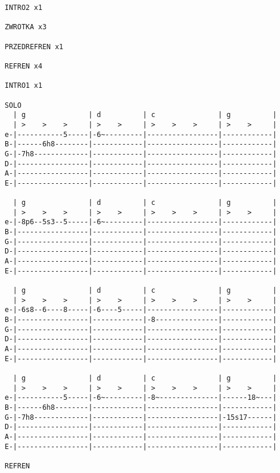 \begin{verbatim}
INTRO2 x1

ZWROTKA x3

PRZEDREFREN x1

REFREN x4

INTRO1 x1

SOLO
  | g               | d          | c               | g          |
  | >    >    >     | >    >     | >    >    >     | >    >     |
e-|-----------5-----|-6~---------|-----------------|------------|
B-|------6h8--------|------------|-----------------|------------|
G-|-7h8-------------|------------|-----------------|------------|
D-|-----------------|------------|-----------------|------------|
A-|-----------------|------------|-----------------|------------|
E-|-----------------|------------|-----------------|------------|

  | g               | d          | c               | g          |
  | >    >    >     | >    >     | >    >    >     | >    >     |
e-|-8p6--5s3--5-----|-6~---------|-----------------|------------|
B-|-----------------|------------|-----------------|------------|
G-|-----------------|------------|-----------------|------------|
D-|-----------------|------------|-----------------|------------|
A-|-----------------|------------|-----------------|------------|
E-|-----------------|------------|-----------------|------------|

  | g               | d          | c               | g          |
  | >    >    >     | >    >     | >    >    >     | >    >     |
e-|-6s8--6----8-----|-6----5-----|-----------------|------------|
B-|-----------------|------------|-8---------------|------------|
G-|-----------------|------------|-----------------|------------|
D-|-----------------|------------|-----------------|------------|
A-|-----------------|------------|-----------------|------------|
E-|-----------------|------------|-----------------|------------|

  | g               | d          | c               | g          |
  | >    >    >     | >    >     | >    >    >     | >    >     |
e-|-----------5-----|-6~---------|-8~--------------|------18~---|
B-|------6h8--------|------------|-----------------|------------|
G-|-7h8-------------|------------|-----------------|-15s17------|
D-|-----------------|------------|-----------------|------------|
A-|-----------------|------------|-----------------|------------|
E-|-----------------|------------|-----------------|------------|

REFREN
\end{verbatim}
\newpage


